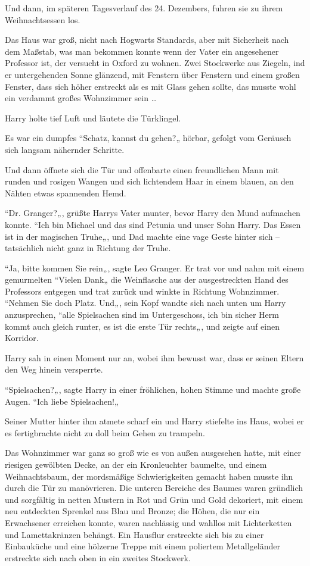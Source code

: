 {Und dann, im späteren Tagesverlauf des 24. Dezembers, fuhren sie zu ihrem Weihnachtsessen los.

Das Haus war groß, nicht nach Hogwarts Standards, aber mit Sicherheit nach dem Maßstab, was man bekommen konnte wenn der Vater ein angesehener Professor ist, der versucht in Oxford zu wohnen. Zwei Stockwerke aus Ziegeln, ind er untergehenden Sonne glänzend, mit Fenstern über Fenstern und einem großen Fenster, dass sich höher erstreckt als es mit Glass gehen sollte, das musste wohl ein verdammt großes Wohnzimmer sein …

Harry holte tief Luft und läutete die Türklingel.

Es war ein dumpfes “Schatz, kannst du gehen?„ hörbar, gefolgt vom Geräusch sich langsam nähernder Schritte.

Und dann öffnete sich die Tür und offenbarte einen freundlichen Mann mit runden und rosigen Wangen und sich lichtendem Haar in einem blauen, an den Nähten etwas spannenden Hemd.

“Dr. Granger?„, grüßte Harrys Vater munter, bevor Harry den Mund aufmachen konnte. “Ich bin Michael und das sind Petunia und unser Sohn Harry. Das Essen ist in der magischen Truhe„, und Dad machte eine vage Geste hinter sich -- tatsächlich nicht ganz in Richtung der Truhe.

“Ja, bitte kommen Sie rein„, sagte Leo Granger. Er trat vor und nahm mit einem gemurmelten “Vielen Dank„ die Weinflasche aus der ausgestreckten Hand des Professors entgegen und trat zurück und winkte in Richtung Wohnzimmer. “Nehmen Sie doch Platz. Und„, sein Kopf wandte sich nach unten um Harry anzusprechen, “alle Spielsachen sind im Untergeschoss, ich bin sicher Herm kommt auch gleich runter, es ist die erste Tür rechts„, und zeigte auf einen Korridor.

Harry sah in einen Moment nur an, wobei ihm bewusst war, dass er seinen Eltern den Weg hinein versperrte.

“Spielsachen?„, sagte Harry in einer fröhlichen, hohen Stimme und machte große Augen. “Ich liebe Spielsachen!„

Seiner Mutter hinter ihm atmete scharf ein und Harry stiefelte ins Haus, wobei er es fertigbrachte nicht zu doll beim Gehen zu trampeln.

Das Wohnzimmer war ganz so groß wie es von außen ausgesehen hatte, mit einer riesigen gewölbten Decke, an der ein Kronleuchter baumelte, und einem Weihnachtsbaum, der mordsmäßige Schwierigkeiten gemacht haben musste ihn durch die Tür zu manövrieren. Die unteren Bereiche des Baumes waren gründlich und sorgfältig in netten Mustern in Rot und Grün und Gold dekoriert, mit einem neu entdeckten Sprenkel aus Blau und Bronze; die Höhen, die nur ein Erwachsener erreichen konnte, waren nachlässig und wahllos mit Lichterketten und Lamettakränzen behängt. Ein Hausflur erstreckte sich bis zu einer Einbauküche und eine hölzerne Treppe mit einem poliertem Metallgeländer erstreckte sich nach oben in ein zweites Stockwerk.

}
